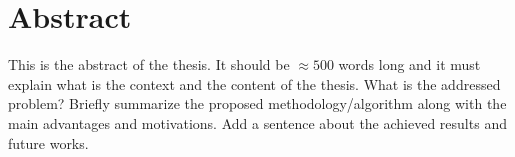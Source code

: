 \chapter{Abstract}
\label{Abstract}
\thispagestyle{empty}

This is the abstract of the thesis. It should be $\approx 500$ words long and it must explain what is the context and the content of the thesis. What is the addressed problem? Briefly summarize the proposed methodology/algorithm along with the main advantages and motivations.
Add a sentence about the achieved results and future works.